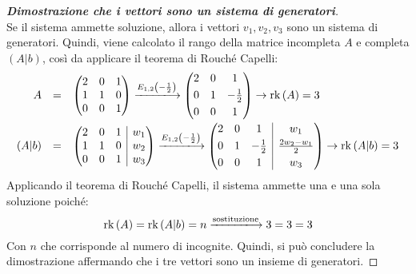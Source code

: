 \documentclass[a4paper]{article}
\makeatletter
\DeclareMathOperator{\rk}{rk}
\newenvironment{rowequmat}[1]{\left(\array{@{}#1@{}}}{\endarray\right)}
\makeatother
\begin{document}
\begin{proof}[\textbf{Dimostrazione che i vettori sono un sistema di generatori}]
\begin{equation*}
		\end{equation*}
		Se il sistema ammette soluzione, allora i vettori $v_{1}, v_{2}, v_{3}$ sono un sistema di generatori. Quindi, viene calcolato il rango della matrice incompleta $A$ e completa $\left(A|b\right)$, così da applicare il teorema di Rouché Capelli:
		\begin{equation*}
			\begin{array}{rll}
				A &=& \begin{rowequmat}{ccc}
					2 & 0 & 1 \\
					1 & 1 & 0 \\
					0 & 0 & 1
				\end{rowequmat} \xlongrightarrow{E_{1,2}\left(-\frac{1}{2}\right)}
				\begin{rowequmat}{ccc}
					2 & 0 & 1 \\ [0.3em]
					0 & 1 & -\frac{1}{2} \\ [0.3em]
					0 & 0 & 1
				\end{rowequmat} \rightarrow \rk\left(A\right) = 3 \\ [1.8em]
				\left(A|b\right) &=& \begin{rowequmat}{ccc|c}
					2 & 0 & 1 & w_{1} \\
					1 & 1 & 0 & w_{2} \\
					0 & 0 & 1 & w_{3}
				\end{rowequmat} \xlongrightarrow{E_{1,2}\left(-\frac{1}{2}\right)}
				\begin{rowequmat}{ccc|c}
					2 & 0 & 1 & w_{1} \\ [0.3em]
					0 & 1 & -\frac{1}{2} & \frac{2w_{2} - w_{1}}{2} \\ [0.3em]
					0 & 0 & 1 & w_{3}
				\end{rowequmat} \rightarrow \rk\left(A|b\right) = 3
			\end{array}
		\end{equation*}
		Applicando il teorema di Rouché Capelli, il sistema ammette una e una sola soluzione poiché:
		\begin{equation*}
			\rk\left(A\right) = \rk\left(A|b\right) = n \xlongrightarrow{\text{sostituzione}} 3 = 3 = 3
		\end{equation*}
		Con $n$ che corrisponde al numero di incognite. Quindi, si può concludere la dimostrazione affermando che i tre vettori sono un insieme di generatori.
	\end{proof}\newpage
	
\end{document}
